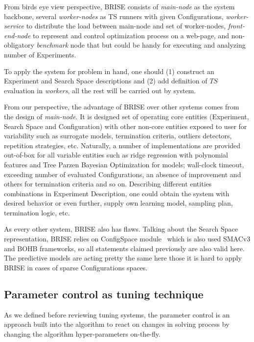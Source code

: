 From birds eye view perspective, BRISE consists of \textit{main-node} as the system backbone, several \textit{worker-nodes} as TS runners with given Configurations, \textit{worker-service} to distribute the load between main-node and set of worker-nodes, \textit{front-end-node} to represent and control optimization process on a web-page, and non-obligatory \textit{benchmark} node that but could be handy for executing and analyzing number of Experiments. 

To apply the system for problem in hand, one should (1) construct an Experiment and Search Space descriptions and (2) add definition of $TS$ evaluation in \textit{workers}, all the rest will be carried out by system.

From our perspective, the advantage of BRISE over other systems comes from the design of \textit{main-node}. It is designed set of operating core entities (Experiment, Search Space and Configuration) with other non-core entities exposed to user for variability such as surrogate models, termination criteria, outliers detectors, repetition strategies, etc. Naturally, a number of implementations are provided out-of-box for all variable entities such as ridge regression with polynomial features and Tree Parzen Bayesian Optimization for models; wall-clock timeout, exceeding number of evaluated Configurations, an absence of improvement and others for termination criteria and so on. Describing different entities combinations in Experiment Description, one could obtain the system with desired behavior or even further, supply own learning model, sampling plan, termination logic, etc. 


As every other system, BRISE also has flaws. Talking about the Search Space representation, BRISE relies on ConfigSpace module~\cite{configspace} which is also used SMACv3 and BOHB frameworks, so all statements claimed previously are also valid here. The predictive models are acting pretty the same here those it is hard to apply BRISE in cases of sparse Configurations spaces.


\subsection{Parameter control as tuning technique}\label{bg: parameter control}
As we defined before reviewing tuning systems, the parameter control is an approach built into the algorithm to react on changes in solving process by changing the algorithm hyper-parameters on-the-fly.

